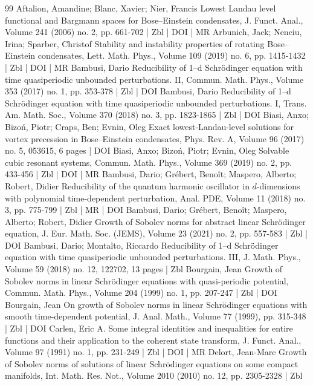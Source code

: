 \documentclass[10pt]{amsart}
\theoremstyle{definition}\newtheorem{defi}[theo]{Definition}\newtheorem{rema}[theo]{Remark}\newtheorem{exam}[theo]{Example}\newtheorem{exem}[theo]{Example}\newtheorem{nota}[theo]{Notation}
\newcommand{\<}{\langle}
\renewcommand{\>}{\rangle}
\begin{document}
\begin{thebibliography}{99}
Aftalion, Amandine; Blanc, Xavier; Nier, Francis Lowest Landau level functional and Bargmann spaces for Bose–Einstein condensates, J. Funct. Anal., Volume 241 (2006) no. 2, pp. 661-702 | Zbl | DOI | MR
Arbunich, Jack; Nenciu, Irina; Sparber, Christof Stability and instability properties of rotating Bose–Einstein condensates, Lett. Math. Phys., Volume 109 (2019) no. 6, pp. 1415-1432 | Zbl | DOI | MR
Bambusi, Dario Reducibility of 1--d Schrödinger equation with time quasiperiodic unbounded perturbations. II, Commun. Math. Phys., Volume 353 (2017) no. 1, pp. 353-378 | Zbl | DOI
Bambusi, Dario Reducibility of 1--d Schrödinger equation with time quasiperiodic unbounded perturbations. I, Trans. Am. Math. Soc., Volume 370 (2018) no. 3, pp. 1823-1865 | Zbl | DOI
Biasi, Anxo; Bizoń, Piotr; Craps, Ben; Evnin, Oleg Exact lowest-Landau-level solutions for vortex precession in Bose–Einstein condensates, Phys. Rev. A, Volume 96 (2017) no. 5, 053615, 6 pages | DOI
Biasi, Anxo; Bizoń, Piotr; Evnin, Oleg Solvable cubic resonant systems, Commun. Math. Phys., Volume 369 (2019) no. 2, pp. 433-456 | Zbl | DOI | MR
Bambusi, Dario; Grébert, Benoît; Maspero, Alberto; Robert, Didier Reducibility of the quantum harmonic oscillator in $d$-dimensions with polynomial time-dependent perturbation, Anal. PDE, Volume 11 (2018) no. 3, pp. 775-799 | Zbl | MR | DOI
Bambusi, Dario; Grébert, Benoît; Maspero, Alberto; Robert, Didier Growth of Sobolev norms for abstract linear Schrödinger equation, J. Eur. Math. Soc. (JEMS), Volume 23 (2021) no. 2, pp. 557-583 | Zbl | DOI
Bambusi, Dario; Montalto, Riccardo Reducibility of 1--d Schrödinger equation with time quasiperiodic unbounded perturbations. III, J. Math. Phys., Volume 59 (2018) no. 12, 122702, 13 pages | Zbl
Bourgain, Jean Growth of Sobolev norms in linear Schrödinger equations with quasi-periodic potential, Commun. Math. Phys., Volume 204 (1999) no. 1, pp. 207-247 | Zbl | DOI
Bourgain, Jean On growth of Sobolev norms in linear Schrödinger equations with smooth time-dependent potential, J. Anal. Math., Volume 77 (1999), pp. 315-348 | Zbl | DOI
Carlen, Eric A. Some integral identities and inequalities for entire functions and their application to the coherent state transform, J. Funct. Anal., Volume 97 (1991) no. 1, pp. 231-249 | Zbl | DOI | MR
Delort, Jean-Marc Growth of Sobolev norms of solutions of linear Schrödinger equations on some compact manifolds, Int. Math. Res. Not., Volume 2010 (2010) no. 12, pp. 2305-2328 | Zbl

\end{thebibliography}
\end{document}
